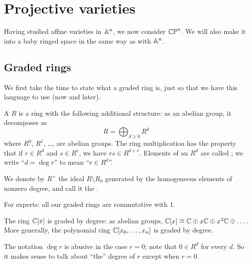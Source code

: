 \chapter{Projective varieties}
Having studied affine varieties in $\mathbb A^n$, we now consider $\mathbb{CP}^n$.
We will also make it into a baby ringed space
in the same way as with $\mathbb A^n$.

\section{Graded rings}
We first take the time to state what a graded ring is,
just so that we have this language to use (now and later).

\begin{definition}
	A  $R$ is a ring with the following additional structure:
	as an abelian group, it decomposes as
	\[ R = \bigoplus_{d \ge 0} R^d \]
	where $R^0$, $R^1$, \dots, are abelian groups.
	The ring multiplication has the property that
	if $r \in R^d$ and $s \in R^e$, we have $rs \in R^{d+e}$.
	Elements of an $R^d$ are called ;
	we write ``$d = \deg r$'' to mean ``$r \in R^d$''.

	We denote by $R^+$ the ideal $R \setminus R_0$ generated by
	the homogeneous elements of nonzero degree,
	and call it the .
\end{definition}
\begin{remark}
	For experts: all our graded rings are commutative with $1$.
\end{remark}
\begin{example}
	\listhack
	\begin{enumerate}[(a)]
		\ii The ring $\mathbb C[x]$ is graded by degree: as abelian groups,
		$\mathbb C[x] \cong \mathbb C \oplus x\mathbb C \oplus x^2\mathbb C \oplus \dots$.
		\ii More generally, the polynomial ring $\mathbb C[x_0, \dots, x_n]$
		is graded by degree.
	\end{enumerate}
\end{example}
\begin{abuse}
	The notation $\deg r$ is abusive in the case $r = 0$;
	note that $0 \in R^d$ for every $d$.
	So it makes sense to talk about ``the'' degree of $r$
	except when $r = 0$.
\end{abuse}

